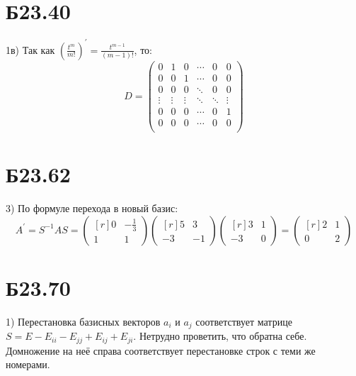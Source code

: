 \documentclass[a4paper,12pt]{article} %
\begin{document}
\section*{Б23.40}1в)
Так как $\left(\frac{t^{m}}{m!}\right)^{\prime}=\frac{t^{m-1}}{(m-1)!}$, то:
$$D=\begin{pmatrix*}
    0&1&0&\cdots&0&0\\
    0&0&1&\cdots&0&0\\
    0&0&0&\ddots&0&0\\
    \vdots&\vdots&\vdots&\ddots&\ddots&\vdots\\
    0&0&0&\cdots&0&1\\
    0&0&0&\cdots&0&0\\
\end{pmatrix*}$$
\section*{Б23.62}3) По формуле перехода в новый базис:
$$A^{'}=S^{-1}AS=\begin{pmatrix*}[r]
    0&-\frac{1}{3}\\
    1&1
\end{pmatrix*}\begin{pmatrix*}[r]
    5&3\\
    -3&-1
\end{pmatrix*}\begin{pmatrix*}[r]
    3&1\\
    -3&0
\end{pmatrix*}=\begin{pmatrix*}[r]
    2&1\\
    0&2
\end{pmatrix*}$$
\section*{Б23.70}1) Перестановка базисных векторов $a_{i}$ и $a_{j}$ соответствует матрице $S=E-E_{ii}-E_{jj}+E_{ij}+E_{ji}$. Нетрудно проветить, что обратна себе. Домножение на неё справа соответствует перестановке строк с теми же номерами.
\end{document}
